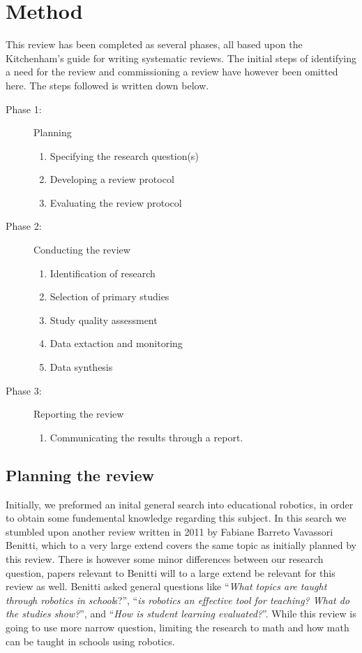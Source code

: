 \section*{Method}
This review has been completed as several phases, all based upon the Kitchenham's guide for writing systematic reviews\cite{kitchenham2007guidelines}. The initial steps of identifying a need for the review and commissioning a review have however been omitted here. The steps followed is written down below.
\begin{description}
	\item[Phase 1: ] Planning
		\begin{enumerate}
			\item Specifying the research question(s)
			\item Developing a review protocol
			\item Evaluating the review protocol
		\end{enumerate}
	\item[Phase 2: ] Conducting the review
		\begin{enumerate}
			\item Identification of research
			\item Selection of primary studies
			\item Study quality assessment
			\item Data extaction and monitoring
			\item Data synthesis
		\end{enumerate}
	\item[Phase 3: ] Reporting the review
		\begin{enumerate}
			\item Communicating the results through a report.
		\end{enumerate}
\end{description}

\subsection*{Planning the review}
Initially, we preformed an inital general search into educational robotics, in order to obtain some fundemental knowledge regarding this subject. In this search we stumbled upon another review written in 2011 by Fabiane Barreto Vavassori Benitti\cite{Benitti2012978}, which to a very large extend covers the same topic as initially planned by this review. There is however some minor differences between our research question, papers relevant to Benitti will to a large extend be relevant for this review as well. Benitti asked general questions like "`\textit{What topics are taught through robotics in school}s?"', "`\textit{is robotics an effective tool for teaching? What do the studies show?}"', and "`\textit{How is student learning evaluated?}"'. While this review is going to use more narrow question, limiting the research to math and how math can be taught in schools using robotics. 

